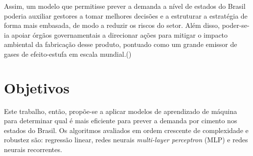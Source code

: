 Assim, um modelo que permitisse prever a demanda a nível de 
estados do Brasil poderia auxiliar gestores a tomar melhores 
decisões e a estruturar a estratégia de forma mais embasada, de 
modo a reduzir os riscos do setor. Além disso, poder-se-ia apoiar órgãos 
governamentais a direcionar ações para mitigar o impacto ambiental da
fabricação desse produto, pontuado como um grande emissor de 
gases de efeito-estufa em escala mundial.(\cite{meio-ambiente})

\section*{Objetivos}

Este trabalho, então, propõe-se a  aplicar modelos de aprendizado 
de máquina para determinar qual é mais eficiente para prever a 
demanda por cimento nos estados do Brasil. Os algoritmos avaliados em ordem 
crescente de complexidade e robustez são: 
regressão linear, redes neurais  \textit{multi-layer perceptron} (MLP) 
e redes neurais recorrentes.






